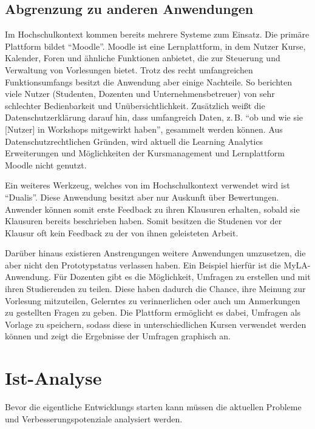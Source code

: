 \subsection{Abgrenzung zu anderen Anwendungen}
Im Hochschulkontext kommen bereits mehrere Systeme zum Einsatz.
Die primäre Plattform bildet \enquote{Moodle}.
Moodle ist eine Lernplattform, in dem Nutzer Kurse, Kalender, Foren und ähnliche Funktionen anbietet, die zur Steuerung und Verwaltung von Vorlesungen bietet.
Trotz des recht umfangreichen Funktionsumfangs besitzt die Anwendung aber einige Nachteile.
So berichten viele Nutzer (Studenten, Dozenten und Unternehmensbetreuer) von sehr schlechter Bedienbarkeit und Unübersichtlichkeit.
Zusätzlich weißt die Datenschutzerklärung darauf hin, dass umfangreich Daten, z.\,B. \enquote{ob und wie sie [Nutzer] in Workshops mitgewirkt haben}, gesammelt werden können.\autocites{moodleTermsOfServiceDHBW}{moodleTermsOfService}
Aus Datenschutzrechtlichen Gründen, wird aktuell die Learning Analytics Erweiterungen und Möglichkeiten der Kursmanagement und Lernplattform Moodle nicht genutzt.

Ein weiteres Werkzeug, welches von im Hochschulkontext verwendet wird ist \enquote{Dualis}.
Diese Anwendung besitzt aber nur Auskunft über Bewertungen.
Anwender können somit erste Feedback zu ihren Klausuren erhalten, sobald sie Klausuren bereits beschrieben haben.
Somit besitzen die Studenen vor der Klausur oft kein Feedback zu der von ihnen geleisteten Arbeit.

Darüber hinaus existieren Anstrengungen weitere Anwendungen umzusetzen, die aber nicht den Prototypstatus verlassen haben.
Ein Beispiel hierfür ist die MyLA-Anwendung.\autocite{mylaGithub}
Für Dozenten gibt es die Möglichkeit, Umfragen zu erstellen und mit ihren Studierenden zu teilen.
Diese haben dadurch die Chance, ihre Meinung zur Vorlesung mitzuteilen, Gelerntes zu verinnerlichen oder auch um Anmerkungen zu gestellten Fragen zu geben.
Die Plattform ermöglicht es dabei, Umfragen als Vorlage zu speichern, sodass diese in unterschiedlichen Kursen verwendet werden können und zeigt die Ergebnisse der Umfragen graphisch an.





\section{Ist-Analyse} %
Bevor die eigentliche Entwicklungs starten kann müssen die aktuellen Probleme und Verbesserungspotenziale analysiert werden.

